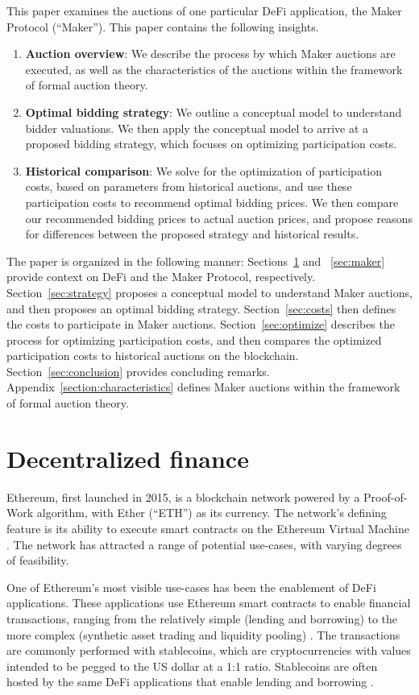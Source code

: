 \documentclass[conference]{IEEEtran}
\begin{document}
This paper examines the auctions of one particular DeFi application, the Maker Protocol (``Maker''). This paper contains the following insights.
\begin{enumerate}
    \item \textbf{Auction overview}: We describe the process by which Maker auctions are executed, as well as the characteristics of the auctions within the framework of formal auction theory.
    \item \textbf{Optimal bidding strategy}: We outline a conceptual model to understand bidder valuations. We then apply the conceptual model to  arrive at a proposed bidding strategy, which focuses on optimizing participation costs.
    \item \textbf{Historical comparison}: We solve for the optimization of participation costs, based on parameters from historical auctions, and use these participation costs to recommend optimal bidding prices. We then compare our recommended bidding prices to actual auction prices, and propose reasons for differences between the proposed strategy and historical results.
\end{enumerate}

The paper is organized in the following manner: Sections~\ref{sec:DeFi} and ~\ref{sec:maker} provide context on DeFi and the Maker Protocol, respectively. Section~\ref{sec:strategy} proposes a conceptual model to understand Maker auctions, and then proposes an optimal bidding strategy. Section~\ref{sec:costs} then defines the costs to participate in Maker auctions. Section~\ref{sec:optimize} describes the process for optimizing participation costs, and then compares the optimized participation costs to historical auctions on the blockchain. Section~\ref{sec:conclusion} provides concluding remarks. Appendix~\ref{section:characteristics} defines Maker auctions within the framework of formal auction theory.

\section{Decentralized finance}
\label{sec:DeFi}
Ethereum, first launched in 2015, is a blockchain network powered by a Proof-of-Work algorithm, with Ether (``ETH'') as its currency. The network's defining feature is its ability to execute smart contracts on the Ethereum Virtual Machine \cite{ethWhitePaper}. The network has attracted a range of potential use-cases, with varying degrees of feasibility. 

One of Ethereum's most visible use-cases has been the enablement of DeFi applications. These applications use Ethereum smart contracts to enable financial transactions, ranging from the relatively simple (lending and borrowing) to the more complex (synthetic asset trading and liquidity pooling) \cite{wsjDefi}. The transactions are commonly performed with stablecoins, which are cryptocurrencies with values intended to be pegged to the US dollar at a 1:1 ratio. Stablecoins are often hosted by the same DeFi applications that enable lending and borrowing \cite{wsjStablecoins}.
\end{document}
